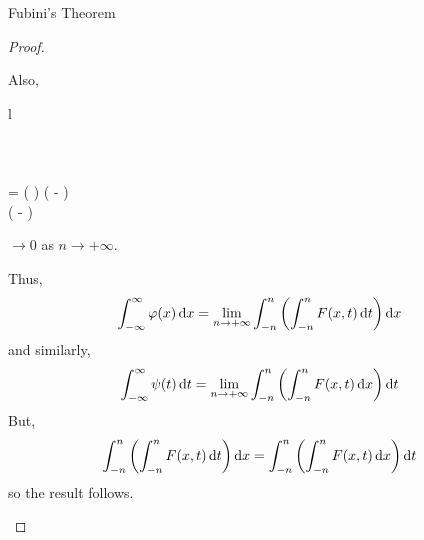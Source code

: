 \begin{section}{Fubini's Theorem}
\begin{proof}
\begin{enumerate}[i)]
	Also,
		\begin{IEEEeqnarray*}{l}
			 \\
			\leq {} \\
			\leq {} \\
			\leq {} \\
			= \left(  \right)
				\left(
				-  \right) \\
			\leq {} \left(
				-  \right)
		\end{IEEEeqnarray*}
	$\rightarrow 0$ as $n \rightarrow +\infty$.
	
	Thus, 
		\begin{displaymath}
			\myintb{\varphi(x)}{x}
				= \lim_{n \rightarrow +\infty}
				\myintb[n]{\left(
				\myintb[n]{F(x,t)}{t} \right)}{x}
		\end{displaymath}
	and similarly,
		\begin{displaymath}
			\myintb{\psi(t)}{t}
				= \lim_{n \rightarrow +\infty}
				\myintb[n]{\left(
				\myintb[n]{F(x,t)}{x} \right)}{t}
		\end{displaymath}
	But,
		\begin{displaymath}
			\myintb[n]{\left(
				\myintb[n]{F(x,t)}{t} \right)}{x}
			= \myintb[n]{\left(
				\myintb[n]{F(x,t)}{x} \right)}{t}
		\end{displaymath}
	so the result follows.
	\end{enumerate}
\end{proof}

\end{section}
